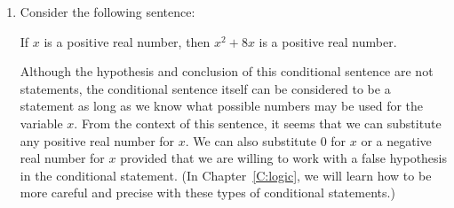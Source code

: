 \hbreak




\begin{prog} \label{prog:condition} \hfill
\begin{enumerate}


\item Consider the following sentence:
\begin{center}
If $x$ is a positive real number, then $x^2 + 8x$ is a positive real number.
\end{center}
Although the hypothesis and conclusion of this conditional sentence are not statements, the conditional sentence itself can be considered to be a statement as long as we know what possible numbers may be used for the variable $x$.  From the context of this sentence, it seems that we can substitute any positive real number for $x$.  We can also substitute 0 for $x$ or a negative real number for $x$ provided that we are willing to work with a false hypothesis in the conditional statement.  (In Chapter~\ref{C:logic}, we will learn how to be more careful and precise with these types of conditional statements.)


\end{enumerate}
\end{prog}
